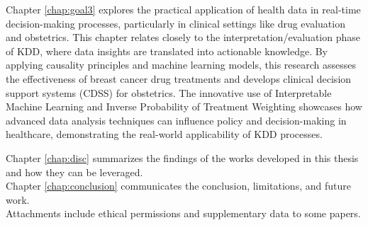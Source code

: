 Chapter \ref{chap:goal3} explores the practical application of health data in real-time decision-making processes, particularly in clinical settings like drug evaluation and obstetrics. This chapter relates closely to the interpretation/evaluation phase of KDD, where data insights are translated into actionable knowledge. By applying causality principles and machine learning models, this research assesses the effectiveness of breast cancer drug treatments and develops clinical decision support systems (CDSS) for obstetrics. The innovative use of Interpretable Machine Learning and Inverse Probability of Treatment Weighting showcases how advanced data analysis techniques can influence policy and decision-making in healthcare, demonstrating the real-world applicability of KDD processes.


Chapter \ref{chap:disc} summarizes the findings of the works developed in this thesis and how they can be leveraged. \\

Chapter \ref{chap:conclusion} communicates the conclusion, limitations, and future work.\\

Attachments include ethical permissions and supplementary data to some papers.

